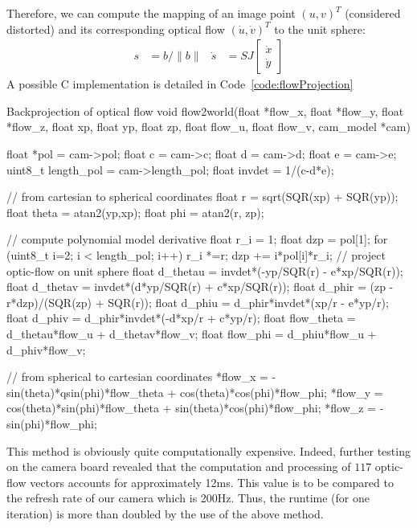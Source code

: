Therefore, we can compute the mapping of an image point $(u,v)^T$ (considered distorted) and its corresponding optical flow $(\dot{u}, \dot{v})^T$ to the unit sphere:
\begin{align}
s &= b/\|b\| & \dot{s} &= SJ \begin{bmatrix} \dot{x} \\ \dot{y} \end{bmatrix}
\end{align}
A possible C implementation is detailed in Code~\ref{code:flowProjection}

\begin{center}
\begin{code}[colback=white, label=code:flowProjection]{Backprojection of optical flow}
void flow2world(float *flow_x, float *flow_y, float *flow_z, 
		float xp, float yp, float zp, float flow_u, 
		float flow_v, cam_model *cam)
{
	 float *pol    = cam->pol;
	 float c       = cam->c;
	 float d       = cam->d;
	 float e       = cam->e;
	 uint8_t length_pol = cam->length_pol;
	 float invdet  = 1/(c-d*e); 
	 
	 // from cartesian to spherical coordinates
	 float r   = sqrt(SQR(xp) + SQR(yp));
	 float theta = atan2(yp,xp);
	 float phi = atan2(r, zp); 
	 
	 // compute polynomial model derivative
	 float r_i = 1;
	 float dzp = pol[1];
	 for (uint8_t i=2; i < length_pol; i++)
	 {
	   r_i *=r;
	   dzp += i*pol[i]*r_i;
	 }
	 // project optic-flow on unit sphere
	 float d_thetau = invdet*(-yp/SQR(r) - e*xp/SQR(r));
	 float d_thetav = invdet*(d*yp/SQR(r) + c*xp/SQR(r));
	 float d_phir = (zp - r*dzp)/(SQR(zp) + SQR(r));
	 float d_phiu = d_phir*invdet*(xp/r - e*yp/r);
	 float d_phiv = d_phir*invdet*(-d*xp/r + c*yp/r);
	 float flow_theta = d_thetau*flow_u 
	 		   + d_thetav*flow_v;
	 float flow_phi = d_phiu*flow_u + d_phiv*flow_v;
	 
	 // from spherical to cartesian coordinates
	 *flow_x = -sin(theta)*qsin(phi)*flow_theta 
	 	   + cos(theta)*cos(phi)*flow_phi;
	 *flow_y = cos(theta)*sin(phi)*flow_theta 
	 	   + sin(theta)*cos(phi)*flow_phi;
	 *flow_z = -sin(phi)*flow_phi;
}
\end{code}
\end{center}

This method is obviously quite computationally expensive. Indeed, further testing on the camera board revealed that the computation  and processing of $117$ optic-flow vectors accounts for approximately 12ms. This value is to be compared to the refresh rate of our camera which is 200Hz. Thus, the runtime (for one iteration) is more than doubled by the use of the above method. 

